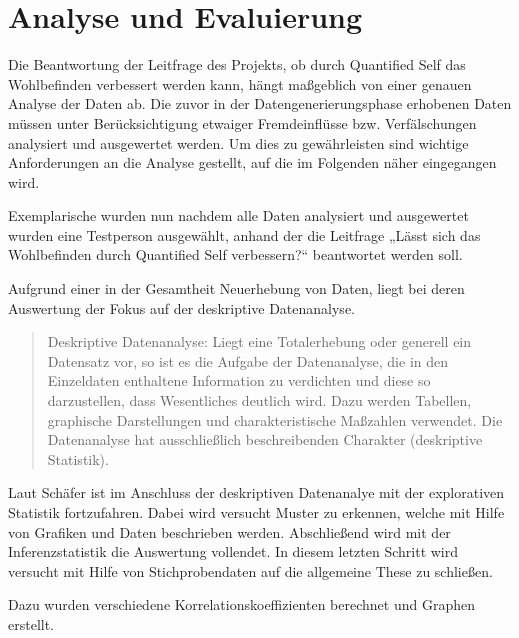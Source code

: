
\chapter{Analyse und Evaluierung}
\label{ch:AnalyseUndEvaluierung}

Die Beantwortung der Leitfrage des Projekts, ob durch Quantified Self das Wohlbefinden verbessert werden kann, hängt maßgeblich von einer genauen Analyse der Daten ab. 
Die zuvor in der Datengenerierungsphase erhobenen Daten müssen unter Berücksichtigung etwaiger Fremdeinflüsse bzw. Verfälschungen analysiert und ausgewertet werden.
Um dies zu gewährleisten sind wichtige Anforderungen an die Analyse gestellt, auf die im Folgenden näher eingegangen wird.

Exemplarische wurden nun nachdem alle Daten analysiert und ausgewertet wurden eine Testperson ausgewählt, anhand der die Leitfrage „Lässt sich das Wohlbefinden durch Quantified Self verbessern?“ beantwortet werden soll.

Aufgrund einer in der Gesamtheit Neuerhebung von Daten, liegt bei deren Auswertung der Fokus auf der deskriptive Datenanalyse.

\begin{quote}
Deskriptive Datenanalyse: Liegt eine Totalerhebung oder generell ein Datensatz vor, so ist es die Aufgabe der Datenanalyse, die in den Einzeldaten enthaltene Information zu verdichten und diese so darzustellen, dass Wesentliches deutlich wird. Dazu werden Tabellen, graphische Darstellungen und charakteristische Maßzahlen verwendet.  Die Datenanalyse hat ausschließlich beschreibenden Charakter (deskriptive Statistik). 
\end{quote}
\cite{http://wirtschaftslexikon.gabler.de/Definition/datenanalyse.html?referenceKeywordName=statistische+Datenanalyse}


Laut Schäfer\cite{Schafer2010} ist im Anschluss der deskriptiven Datenanalye mit der explorativen Statistik fortzufahren.
Dabei wird versucht Muster zu erkennen, welche mit Hilfe von Grafiken und Daten beschrieben werden.
Abschließend wird mit der Inferenzstatistik die Auswertung vollendet.
In diesem letzten Schritt wird versucht mit Hilfe von Stichprobendaten auf die allgemeine These zu schließen.

Dazu wurden verschiedene Korrelationskoeffizienten berechnet und Graphen erstellt.




